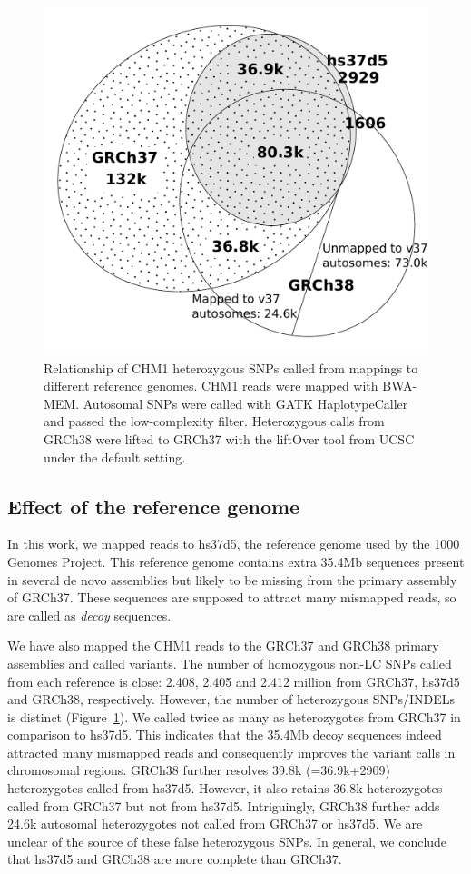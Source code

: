 \documentclass{bioinfo}
\begin{document}
\begin{figure}[!hbtp]
\centering
\includegraphics[width=.35\textwidth]{venn2/ref}
\caption{Relationship of CHM1 heterozygous SNPs called from mappings to
different reference genomes. CHM1 reads were mapped with BWA-MEM. Autosomal
SNPs were called with GATK HaplotypeCaller and passed the low-complexity
filter. Heterozygous calls from GRCh38 were lifted to GRCh37 with the liftOver
tool from UCSC under the default setting.}\label{fig:ref}
\end{figure}

\subsection{Effect of the reference genome}\label{sec:ref}
In this work, we mapped reads to hs37d5, the reference genome used by the 1000
Genomes Project. This reference genome contains extra 35.4Mb sequences present
in several de novo assemblies but likely to be missing from the primary
assembly of GRCh37. These sequences are supposed to attract many mismapped
reads, so are called as \emph{decoy} sequences.

We have also mapped the CHM1 reads to the GRCh37 and GRCh38 primary assemblies
and called variants. The number of homozygous non-LC SNPs called from each
reference is close: 2.408, 2.405 and 2.412 million from GRCh37, hs37d5 and
GRCh38, respectively. However, the number of heterozygous SNPs/INDELs is
distinct (Figure~\ref{fig:ref}).  We called twice as many as heterozygotes from
GRCh37 in comparison to hs37d5.  This indicates that the 35.4Mb decoy sequences
indeed attracted many mismapped reads and consequently improves the variant
calls in chromosomal regions.  GRCh38 further resolves 39.8k (=36.9k+2909)
heterozygotes called from hs37d5.  However, it also retains 36.8k heterozygotes
called from GRCh37 but not from hs37d5. Intriguingly, GRCh38 further adds 24.6k
autosomal heterozygotes not called from GRCh37 or hs37d5. We are unclear of the
source of these false heterozygous SNPs. In general, we conclude that hs37d5
and GRCh38 are more complete than GRCh37.
\end{document}
